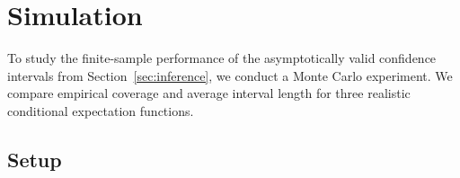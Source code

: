 


\section{Simulation}

To study the finite-sample performance of the asymptotically valid confidence intervals from Section~\ref{sec:inference},
we conduct a Monte Carlo experiment.
We compare empirical coverage and average interval length for three realistic conditional expectation functions.

\subsection{Setup}


